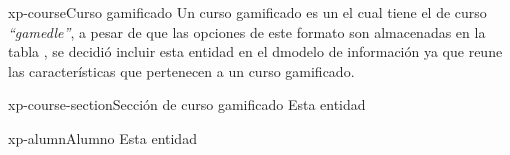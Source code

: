     \begin{cdtEntidad}{xp-course}{Curso gamificado}{%
    Un curso gamificado es un  el cual tiene el
     de curso {\it ``gamedle''}, a pesar de que las
    opciones de este formato son almacenadas en la tabla 
    , se decidió incluir esta entidad en el
    dmodelo de información ya que reune las características que pertenecen a un curso
    gamificado.}




    \end{cdtEntidad}

    \begin{cdtEntidad}{xp-course-section}{Sección de curso gamificado}{%
    Esta entidad }
    \end{cdtEntidad}

    \begin{cdtEntidad}{xp-alumn}{Alumno}{%
    Esta entidad }
    \end{cdtEntidad}
